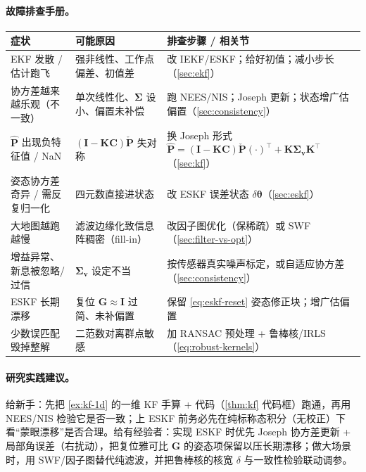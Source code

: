 \paragraph{故障排查手册。}
\begin{table}[ht]\centering\small
\begin{tabular}{p{}p{}p{}}
\toprule
症状 & 可能原因 & 排查步骤 / 相关节 \\
\midrule
EKF 发散 / 估计跑飞 & 强非线性、工作点偏差、初值差 & 改 IEKF/ESKF；给好初值；减小步长（\cref{sec:ekf}） \\
协方差越来越乐观（不一致） & 单次线性化、$\boldsymbol{\Sigma}$ 设小、偏置未补偿 & 跑 NEES/NIS；Joseph 更新；状态增广估偏置（\cref{sec:consistency}） \\
$\hat{\mathbf{P}}$ 出现负特征值 / NaN & $(\mathbf{I}-\mathbf{K}\mathbf{C})\check{\mathbf{P}}$ 失对称 & 换 Joseph 形式 $\hat{\mathbf{P}}=(\mathbf{I}-\mathbf{K}\mathbf{C})\check{\mathbf{P}}(\cdot)^\top+\mathbf{K}\boldsymbol{\Sigma}_{\mathbf{v}}\mathbf{K}^\top$（\cref{sec:kf}） \\
姿态协方差奇异 / 需反复归一化 & 四元数直接进状态 & 改 ESKF 误差状态 $\delta\boldsymbol{\theta}$（\cref{sec:eskf}） \\
大地图越跑越慢 & 滤波边缘化致信息阵稠密（fill-in） & 改因子图优化（保稀疏）或 SWF（\cref{sec:filter-vs-opt}） \\
增益异常、新息被忽略/过信 & $\boldsymbol{\Sigma}_{\mathbf{v}}$ 设定不当 & 按传感器真实噪声标定，或自适应协方差（\cref{sec:consistency}） \\
ESKF 长期漂移 & 复位 $\mathbf{G}\approx\mathbf{I}$ 过简、未补偏置 & 保留 \cref{eq:eskf-reset} 姿态修正块；增广估偏置 \\
少数误匹配毁掉整解 & 二范数对离群点敏感 & 加 RANSAC 预处理 + 鲁棒核/IRLS（\cref{eq:robust-kernels}） \\
\bottomrule
\end{tabular}
\end{table}

\paragraph{研究实践建议。}
给新手：先把 \cref{ex:kf-1d} 的一维 KF 手算 + 代码（\cref{thm:kf} 代码框）跑通，再用 NEES/NIS 检验它是否一致；上 ESKF 前务必先在纯标称态积分（无校正）下看“蒙眼漂移”是否合理。给有经验者：实现 ESKF 时优先 Joseph 协方差更新 + 局部角误差（右扰动），把复位雅可比 $\mathbf{G}$ 的姿态项保留以压长期漂移；做大场景时，用 SWF/因子图替代纯滤波，并把鲁棒核的核宽 $\delta$ 与一致性检验联动调参。

